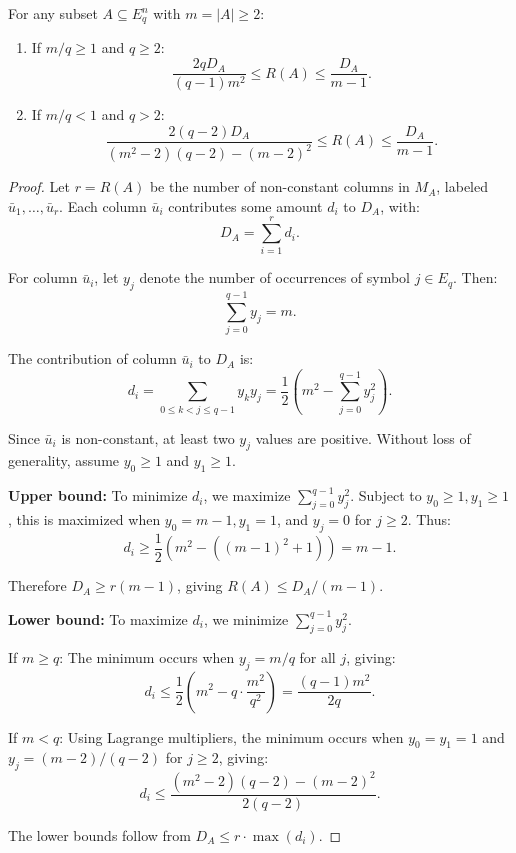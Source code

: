 \documentclass[10pt,a4paper]{amsart}
\newcommand{\Eqn}{E_q^n}
\newcommand{\Eq}{E_q}
\renewcommand{\geq}{\geqslant}
\renewcommand{\leq}{\leqslant}
\begin{document}
\begin{theorem}
\label{thm:main}
For any subset $A \subseteq \Eqn$ with $m = |A| \geq 2$:
\begin{enumerate}
\item If $m/q \geq 1$ and $q \geq 2$:
\[
\frac{2qD_A}{(q-1)m^2} \leq R(A) \leq \frac{D_A}{m-1}.
\]
\item If $m/q < 1$ and $q > 2$:
\[
\frac{2(q-2)D_A}{(m^2-2)(q-2)-(m-2)^2} \leq R(A) \leq \frac{D_A}{m-1}.
\]
\end{enumerate}
\end{theorem}

\begin{proof}
Let $r = R(A)$ be the number of non-constant columns in $M_A$, labeled $\bar{u}_1, \ldots, \bar{u}_r$. Each column $\bar{u}_i$ contributes some amount $d_i$ to $D_A$, with:
\[
D_A = \sum_{i=1}^r d_i.
\]

For column $\bar{u}_i$, let $y_j$ denote the number of occurrences of symbol $j \in \Eq$. Then:
\[
\sum_{j=0}^{q-1} y_j = m.
\]

The contribution of column $\bar{u}_i$ to $D_A$ is:
\[
d_i = \sum_{0 \leq k < j \leq q-1} y_k y_j = \frac{1}{2}\left(m^2 - \sum_{j=0}^{q-1} y_j^2\right).
\]

Since $\bar{u}_i$ is non-constant, at least two $y_j$ values are positive. Without loss of generality, assume $y_0 \geq 1$ and $y_1 \geq 1$.

\textbf{Upper bound:} To minimize $d_i$, we maximize $\sum_{j=0}^{q-1} y_j^2$. Subject to $y_0 \geq 1, y_1 \geq 1$, this is maximized when $y_0 = m-1, y_1 = 1$, and $y_j = 0$ for $j \geq 2$. Thus:
\[
d_i \geq \frac{1}{2}(m^2 - ((m-1)^2 + 1)) = m - 1.
\]

Therefore $D_A \geq r(m-1)$, giving $R(A) \leq D_A/(m-1)$.

\textbf{Lower bound:} To maximize $d_i$, we minimize $\sum_{j=0}^{q-1} y_j^2$.

If $m \geq q$: The minimum occurs when $y_j = m/q$ for all $j$, giving:
\[
d_i \leq \frac{1}{2}\left(m^2 - q \cdot \frac{m^2}{q^2}\right) = \frac{(q-1)m^2}{2q}.
\]

If $m < q$: Using Lagrange multipliers, the minimum occurs when $y_0 = y_1 = 1$ and $y_j = (m-2)/(q-2)$ for $j \geq 2$, giving:
\[
d_i \leq \frac{(m^2-2)(q-2)-(m-2)^2}{2(q-2)}.
\]

The lower bounds follow from $D_A \leq r \cdot \max(d_i)$.
\end{proof}
\end{document}

